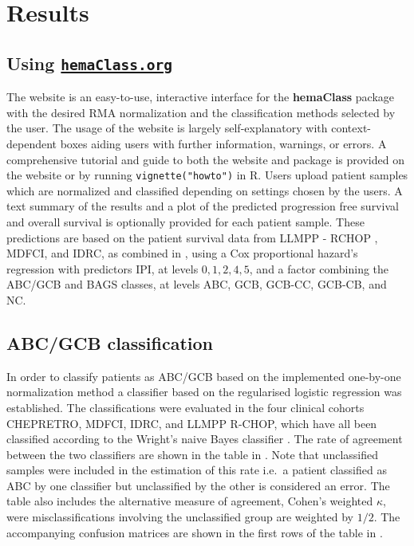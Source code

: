 \documentclass[10pt,letterpaper]{article}
\newcommand{\hemaClass}{\href{http://hemaClass.org}{\texttt{hemaClass.org}}}
\newcommand{\R}{\textsf{R}}
\newcommand{\pkg}[1]{\textbf{#1}}
\begin{document}
\section*{Results}
\subsection*{Using \hemaClass{}}
The website is an easy-to-use, interactive interface for the \pkg{hemaClass} package with the desired RMA normalization and the classification methods selected by the user.
The usage of the website is largely self-explanatory with context-dependent boxes aiding users with further information, warnings, or errors.
A comprehensive tutorial and guide to both the website and package is provided on the website or by running \texttt{vignette("howto")} in \R{}.
Users upload patient samples which are normalized and classified depending on settings chosen by the users.
A text summary of the results and a plot of the predicted progression free survival and overall survival is optionally provided for each patient sample.
These predictions are based on the patient survival data from LLMPP - RCHOP , MDFCI, and IDRC, as combined in \cite{DybkaerBoegsted2015}, using a Cox proportional hazard's regression with predictors IPI, at levels $0,1,2,4,5$, and a factor combining the ABC/GCB and BAGS classes, at levels ABC, GCB, GCB-CC, GCB-CB, and NC.



\subsection*{ABC/GCB classification}
In order to classify patients as ABC/GCB based on the implemented one-by-one normalization method a classifier based on the regularised logistic regression was established.
The classifications were evaluated in the four clinical cohorts CHEPRETRO, MDFCI, IDRC, and LLMPP R-CHOP, which have all been classified according to the Wright's naive Bayes classifier \cite{Wright2003,Lenz2008a}.
The rate of agreement between the two classifiers are shown in the table in .
Note that unclassified samples were included in the estimation of this rate i.e.\ a patient classified as ABC by one classifier but unclassified by the other is considered an error.
The table also includes the alternative measure of agreement, Cohen's weighted $\kappa$, were misclassifications involving the unclassified group are weighted by $1/2$.
The accompanying confusion matrices are shown in the first rows of the table in .
\end{document}
